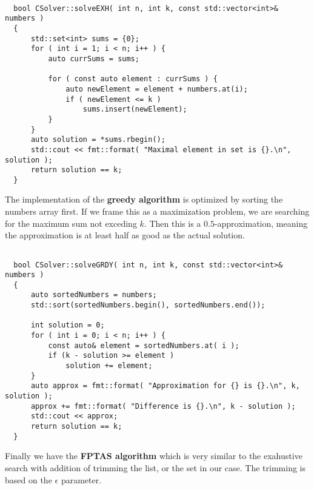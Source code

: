 \documentclass[11pt]{article}
\begin{document}
\begin{verbatim}

  bool CSolver::solveEXH( int n, int k, const std::vector<int>& numbers )
  {
      std::set<int> sums = {0};
      for ( int i = 1; i < n; i++ ) {
          auto currSums = sums;
  
          for ( const auto element : currSums ) {
              auto newElement = element + numbers.at(i);
              if ( newElement <= k )
                  sums.insert(newElement);
          }
      }
      auto solution = *sums.rbegin();
      std::cout << fmt::format( "Maximal element in set is {}.\n", solution );
      return solution == k;
  } 
\end{verbatim}

\pagebreak
The implementation of the \textbf{greedy algorithm} is optimized by sorting the numbers array first. If we frame this as a maximization problem, we are searching for the maximum sum not exceding $k$. Then this is a $0.5$-approximation, meaning the approximation is at least half as good as the actual solution.

\begin{verbatim}

  bool CSolver::solveGRDY( int n, int k, const std::vector<int>& numbers )
  {
      auto sortedNumbers = numbers;
      std::sort(sortedNumbers.begin(), sortedNumbers.end());
  
      int solution = 0;
      for ( int i = 0; i < n; i++ ) {
          const auto& element = sortedNumbers.at( i );
          if (k - solution >= element )
              solution += element;
      }
      auto approx = fmt::format( "Approximation for {} is {}.\n", k, solution );
      approx += fmt::format( "Difference is {}.\n", k - solution );
      std::cout << approx;
      return solution == k;
  }  
\end{verbatim}

Finally we have the \textbf{FPTAS algorithm} which is very similar to the exahustive search with addition of trimming the list, or the set in our case. The trimming is based on the $\epsilon$ parameter.
\end{document}
